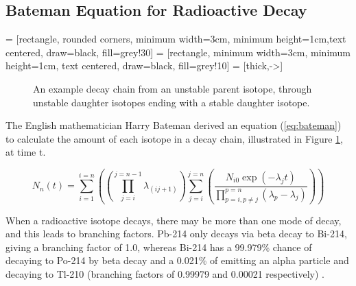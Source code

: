 \subsection{Bateman Equation for Radioactive Decay}

 = [rectangle, rounded corners, minimum width=3cm, minimum height=1cm,text centered, draw=black, fill=grey!30]
 = [rectangle, minimum width=3cm, minimum height=1cm, text centered, draw=black, fill=grey!10]
 = [thick,->]

\begin{figure}[!h]
\centering
{}
\caption{An example decay chain from an unstable parent isotope, through unstable daughter isotopes ending with a stable daughter isotope.}
\label{fig:decaychain}
\end{figure}

The English mathematician Harry Bateman derived an equation (\ref{eq:bateman}) to calculate the amount of each isotope in a decay chain, illustrated in Figure \ref{fig:decaychain}, at time t.

\begin{equation}
N_{n}(t) = \sum_{i=1}^{i=n} \left( \left( \prod_{j=i}^{j=n-1} \lambda_{(ij+1)}\right) \sum_{j=i}^{j=n} \left(\frac{N_{i0}\exp(-\lambda_{j}t)}{\prod_{p=i,p\neq j}^{p=n} (\lambda_{p} - \lambda_{j})}\right)\right)
\label{eq:bateman}
\end{equation}

When a radioactive isotope decays, there may be more than one mode of decay, and this leads to branching factors.  Pb-214 only decays via beta decay to Bi-214, giving a branching factor of 1.0, whereas Bi-214 has a 99.979\% chance of decaying to Po-214 by beta decay and a 0.021\% of emitting an alpha particle and decaying to Tl-210 (branching factors of 0.99979 and 0.00021 respectively) \cite{jeff311}.

